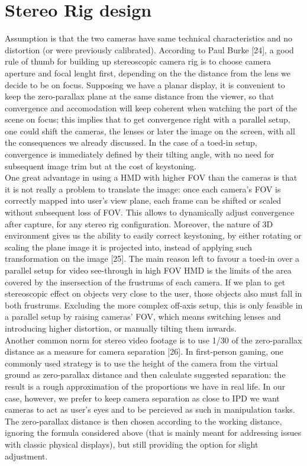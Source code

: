 \section{Stereo Rig design}
Assumption is that the two cameras have same technical characteristics and no distortion (or were previously calibrated). According to Paul Burke [24], a good rule of thumb for building up stereoscopic camera rig is to choose camera aperture and focal lenght first, depending on the the distance from the lens we decide to be on focus. Supposing we have a planar display, it is convenient to keep the zero-parallax plane at the same distance from the viewer, so that convergence and accomodation will keep coherent when watching the part of the scene on focus; this implies that to get convergence right with a parallel setup, one could shift the cameras, the lenses or later the image on the screen, with all the consequences we already discussed. In the case of a toed-in setup, convergence is immediately defined by their tilting angle, with no need for subsequent image trim but at the cost of keystoning.\\
One great advantage in using a HMD with higher FOV than the cameras is that it is not really a problem to translate the image: once each camera’s FOV is correctly mapped into user’s view plane, each frame can be shifted or scaled without subsequent loss of FOV. This allows to dynamically adjust convergence after capture, for any stereo rig configuration. Moreover, the nature of 3D environment gives us the ability to easily correct keystoning, by either rotating or scaling the plane image it is projected into, instead of applying such transformation on the image [25]. The main reason left to favour a toed-in over a parallel setup for video see-through in high FOV HMD is the limits of the area covered by the insersection of the frustrums of each camera. If we plan to get stereoscopic effect on objects very close to the user, those objects also must fall in both frustrums. Excluding the more complex off-axis setup, this is only feasible in a parallel setup by raising cameras’ FOV, which means switching lenses and introducing higher distortion, or manually tilting them inwards.\\
Another common norm for stereo video footage is to use 1/30 of the zero-parallax distance as a measure for camera separation [26]. In first-person gaming, one commonly used strategy is to use the height of the camera from the virtual ground as zero-parallax distance and then calculate suggested separation: the result is a rough approximation of the proportions we have in real life. In our case, however, we prefer to keep camera separation as close to IPD we want cameras to act as user’s eyes and to be percieved as such in manipulation tasks. The zero-parallax distance is then chosen according to the working distance, ignoring the formula considered above (that is mainly meant for addressing issues with classic physical displays), but still providing the option for slight adjustment.\\

